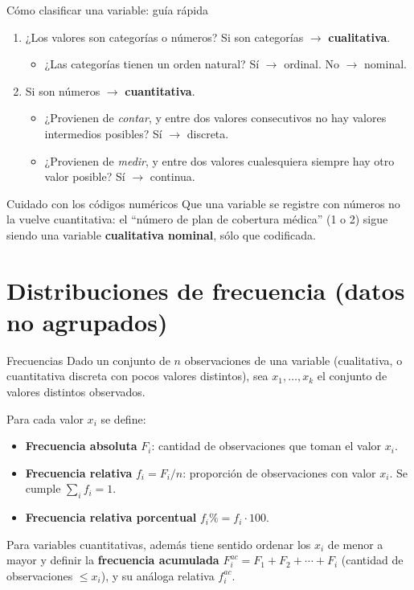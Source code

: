 \documentclass[aspectratio=169,11pt]{beamer}
\begin{document}
\begin{frame}{Cómo clasificar una variable: guía rápida}
\begin{enumerate}
\item ¿Los valores son categorías o números? Si son categorías $\to$ \textbf{cualitativa}.
\begin{itemize}
\item[] ¿Las categorías tienen un orden natural? Sí $\to$ ordinal. No $\to$ nominal.
\end{itemize}
\item Si son números $\to$ \textbf{cuantitativa}.
\begin{itemize}
\item[] ¿Provienen de \emph{contar}, y entre dos valores consecutivos no hay valores intermedios posibles? Sí $\to$ discreta.
\item[] ¿Provienen de \emph{medir}, y entre dos valores cualesquiera siempre hay otro valor posible? Sí $\to$ continua.
\end{itemize}
\end{enumerate}
\vspace{0.5em}
\begin{alertblock}{Cuidado con los códigos numéricos}
Que una variable se registre con números no la vuelve cuantitativa: el ``número de plan de cobertura médica'' (1 o 2) sigue siendo una variable \textbf{cualitativa nominal}, sólo que codificada.
\end{alertblock}
\end{frame}

\section{Distribuciones de frecuencia (datos no agrupados)}

\begin{frame}{Frecuencias}
Dado un conjunto de $n$ observaciones de una variable (cualitativa, o cuantitativa discreta con pocos valores distintos), sea $x_1,\dots,x_k$ el conjunto de valores distintos observados.
\begin{definition}
Para cada valor $x_i$ se define:
\begin{itemize}
\item \textbf{Frecuencia absoluta} $F_i$: cantidad de observaciones que toman el valor $x_i$.
\item \textbf{Frecuencia relativa} $f_i = F_i/n$: proporción de observaciones con valor $x_i$. Se cumple $\sum_i f_i = 1$.
\item \textbf{Frecuencia relativa porcentual} $f_i\% = f_i \cdot 100$.
\end{itemize}
\end{definition}
Para variables cuantitativas, además tiene sentido ordenar los $x_i$ de menor a mayor y definir la \textbf{frecuencia acumulada} $F_i^{ac} = F_1+F_2+\cdots+F_i$ (cantidad de observaciones $\leq x_i$), y su análoga relativa $f_i^{ac}$.
\end{frame}
\end{document}

